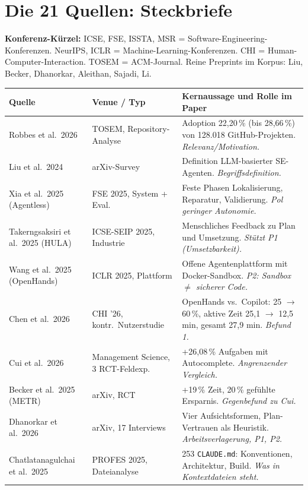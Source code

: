 \documentclass[12pt,a4paper]{article}
\begin{document}
\section{Die 21 Quellen: Steckbriefe}
\label{sec:quellen}

\textbf{Konferenz-Kürzel:} ICSE, FSE, ISSTA, MSR = Software-Engineering-Konferenzen. NeurIPS, ICLR = Machine-Learning-Konferenzen. CHI = Human-Computer-Interaction. TOSEM = ACM-Journal. Reine Preprints im Korpus: Liu, Becker, Dhanorkar, Aleithan, Sajadi, Li.

\begin{longtable}{@{}p{3.5cm}p{3.3cm}p{9.1cm}@{}}
\toprule
\textbf{Quelle} & \textbf{Venue / Typ} & \textbf{Kernaussage und Rolle im Paper} \\
\midrule
\endhead
Robbes et al.\ 2026 & TOSEM, Repository-Analyse & Adoption 22,20\,\% (bis 28,66\,\%) von 128.018 GitHub-Projekten. \emph{Relevanz/Motivation.} \\
Liu et al.\ 2024 & arXiv-Survey & Definition LLM-basierter SE-Agenten. \emph{Begriffsdefinition.} \\
Xia et al.\ 2025 (Agentless) & FSE 2025, System + Eval. & Feste Phasen Lokalisierung, Reparatur, Validierung. \emph{Pol geringer Autonomie.} \\
Takerngsaksiri et al.\ 2025 (HULA) & ICSE-SEIP 2025, Industrie & Menschliches Feedback zu Plan und Umsetzung. \emph{Stützt P1 (Umsetzbarkeit).} \\
Wang et al.\ 2025 (OpenHands) & ICLR 2025, Plattform & Offene Agentenplattform mit Docker-Sandbox. \emph{P2: Sandbox $\neq$ sicherer Code.} \\
Chen et al.\ 2026 & CHI '26, kontr.\ Nutzerstudie & OpenHands vs.\ Copilot: 25 $\to$ 60\,\%, aktive Zeit 25,1 $\to$ 12,5 min, gesamt 27,9 min. \emph{Befund 1.} \\
Cui et al.\ 2026 & Management Science, 3 RCT-Feldexp. & +26,08\,\% Aufgaben mit Autocomplete. \emph{Angrenzender Vergleich.} \\
Becker et al.\ 2025 (METR) & arXiv, RCT & +19\,\% Zeit, 20\,\% gefühlte Ersparnis. \emph{Gegenbefund zu Cui.} \\
Dhanorkar et al.\ 2026 & arXiv, 17 Interviews & Vier Aufsichtsformen, Plan-Vertrauen als Heuristik. \emph{Arbeitsverlagerung, P1, P2.} \\
Chatlatanagulchai et al.\ 2025 & PROFES 2025, Dateianalyse & 253 \texttt{CLAUDE.md}: Konventionen, Architektur, Build. \emph{Was in Kontextdateien steht.} \\

\end{longtable}
\end{document}
